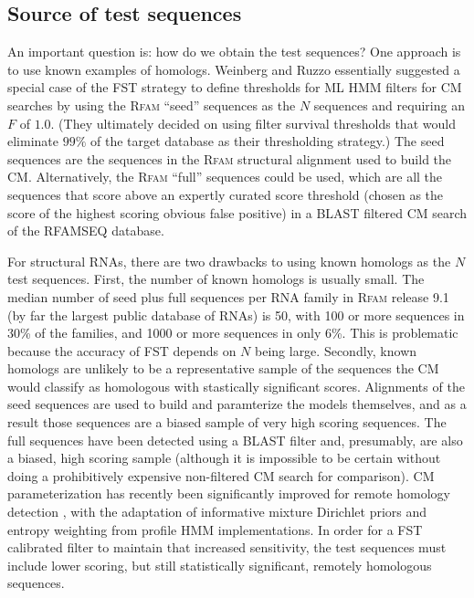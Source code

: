 \subsection{Source of test sequences}
An important question is: how do we obtain the test sequences?  One
approach is to use known examples of homologs.  Weinberg and Ruzzo
essentially suggested a special case of the FST strategy to define
thresholds for ML HMM filters for CM searches by using the
\textsc{Rfam} ``seed'' sequences as the $N$ sequences and requiring an
$F$ of $1.0$. (They ultimately decided on using filter survival
thresholds that would eliminate $99\%$ of the target database as their
thresholding strategy.) The seed sequences are the sequences in the
\textsc{Rfam} structural alignment used to build the
CM. Alternatively, the \textsc{Rfam} ``full'' sequences could be used,
which are all the sequences that score above an expertly curated score
threshold (chosen as the score of the highest scoring obvious false
positive) in a BLAST filtered CM search of the RFAMSEQ database.

For structural RNAs, there are two drawbacks to using known homologs
as the $N$ test sequences.  First, the number of known homologs is
usually small. The median number of seed plus full sequences per RNA
family in \textsc{Rfam} release 9.1 (by far the largest public
database of RNAs) is 50, with 100 or more sequences in 30\% of the
families, and 1000 or more sequences in only 6\%.  This is problematic
because the accuracy of FST depends on $N$ being large.  Secondly,
known homologs are unlikely to be a representative sample of the
sequences the CM would classify as homologous with stastically
significant scores.  Alignments of the seed sequences are used to
build and paramterize the models themselves, and as a result those
sequences are a biased sample of very high scoring sequences.  The
full sequences have been detected using a BLAST filter and,
presumably, are also a biased, high scoring sample (although it is
impossible to be certain without doing a prohibitively expensive
non-filtered CM search for comparison).  CM parameterization has
recently been significantly improved for remote homology detection
\citep{NawrockiEddy07}, with the adaptation of informative mixture
Dirichlet priors and entropy weighting from profile HMM
implementations. In order for a FST calibrated filter to maintain that
increased sensitivity, the test sequences must include lower scoring,
but still statistically significant, remotely homologous sequences.

